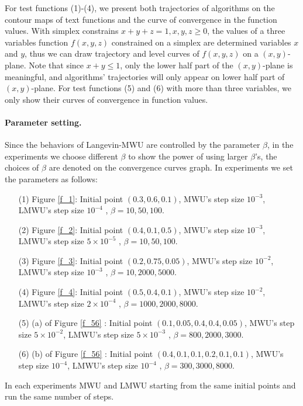 For test functions (1)-(4), we present both trajectories of algorithms on the contour maps of text functions and the curve of convergence in the function values. With simplex constrains $x + y + z = 1, x,y,z \ge 0$, the values of a three variables function $f(x,y,z) $ constrained on a simplex are determined variables $x$ and $y$, thus we can draw trajectory and level curves of $f(x,y,z)$ on a $(x,y)$-plane. Note that since $x + y \le 1$, only the lower half part of the $(x,y)$-plane is meaningful, and algorithms' trajectories will only appear on lower half part of $(x,y)$-plane. For test functions (5) and (6) with more than three variables, we only show their curves of convergence in function values.
\paragraph{Parameter setting.} 
Since the behaviors of Langevin-MWU are controlled by the parameter $\beta$, in the experiments we choose different $\beta$ to show the power of using larger $\beta$'s, the choices of $\beta$ are denoted on the convergence curves graph. In experiments we set the parameters as follows:
\begin{itemize}
\item[(1)] Figure \eqref{f_1}: Initial point $(0.3,0.6,0.1)$, MWU's step size $10^{-3}$, LMWU's step size $10^{-4}$ , $\beta  =10,50,100 $.
\item[(2)] Figure \eqref{f_2}: Initial point $(0.4,0.1,0.5)$, MWU's step size $10^{-3}$, LMWU's step size $5 \times 10^{-5}$ , $\beta  =10,50,100 $.
\item[(3)] Figure \eqref{f_3}: Initial point $(0.2,0.75,0.05)$, MWU's step size $10^{-2}$, LMWU's step size $10^{-3}$ , $\beta  =10,2000,5000 $.
\item[(4)] Figure \eqref{f_4}: Initial point $(0.5,0.4,0.1)$, MWU's step size $10^{-2}$, LMWU's step size $2 \times 10^{-4}$ , $\beta  =1000,2000,8000 $.
\item[(5)] (a) of Figure \eqref{f_56} :  Initial point $(0.1,0.05,0.4,0.4,0.05)$, MWU's step size $5 \times 10^{-2}$, LMWU's step size $5 \times 10^{-3}$ , $\beta  =800,2000,3000 $.
\item[(6)] (b) of Figure \eqref{f_56} :  Initial point $(0.4,0.1,0.1,0.2,0.1,0.1)$, MWU's step size $10^{-4}$, LMWU's step size $10^{-4}$ , $\beta=300,3000,8000 $.
\end{itemize}
In each experiments MWU and LMWU starting from the same initial points and run the same number of steps.



